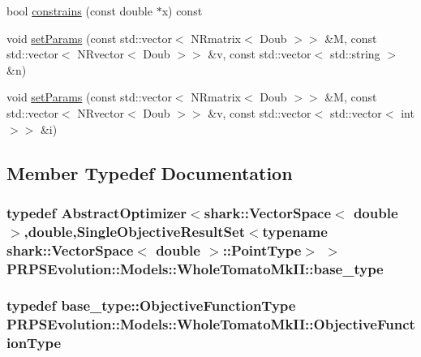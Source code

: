 \begin{DoxyCompactItemize}
\item 
bool \hyperlink{struct_p_r_p_s_evolution_1_1_models_1_1_whole_tomato_mk_i_i_ae8e8d8ff95ca2f9b90a9d72e06a340a0}{constrains} (const double $\ast$x) const 
\item 
void \hyperlink{struct_p_r_p_s_evolution_1_1_models_1_1_whole_tomato_mk_i_i_a398211ab482a09967eb6436f35e28b76}{set\-Params} (const std\-::vector$<$ \-N\-Rmatrix$<$ \-Doub $>$$>$ \&\-M, const std\-::vector$<$ \-N\-Rvector$<$ \-Doub $>$$>$ \&v, const std\-::vector$<$ std\-::string $>$ \&n)
\item 
void \hyperlink{struct_p_r_p_s_evolution_1_1_models_1_1_whole_tomato_mk_i_i_a381dd96ddd96dea9968e07a4b980ab8f}{set\-Params} (const std\-::vector$<$ \-N\-Rmatrix$<$ \-Doub $>$$>$ \&\-M, const std\-::vector$<$ \-N\-Rvector$<$ \-Doub $>$$>$ \&v, const std\-::vector$<$ std\-::vector$<$ int $>$$>$ \&i)
\end{DoxyCompactItemize}


\subsection{\-Member \-Typedef \-Documentation}
\hypertarget{struct_p_r_p_s_evolution_1_1_models_1_1_whole_tomato_mk_i_i_aaf58d587c99a6c98c606c5c60b195a0f}{
\subsubsection[{base\-\_\-type}]{\setlength{\rightskip}{0pt plus 5cm}typedef \-Abstract\-Optimizer$<$shark\-::\-Vector\-Space$<$ double $>$,double,\-Single\-Objective\-Result\-Set$<$typename shark\-::\-Vector\-Space$<$ double $>$\-::\-Point\-Type$>$ $>$ {\bf \-P\-R\-P\-S\-Evolution\-::\-Models\-::\-Whole\-Tomato\-Mk\-I\-I\-::base\-\_\-type}}}\label{struct_p_r_p_s_evolution_1_1_models_1_1_whole_tomato_mk_i_i_aaf58d587c99a6c98c606c5c60b195a0f}
\hypertarget{struct_p_r_p_s_evolution_1_1_models_1_1_whole_tomato_mk_i_i_a6a309578c1c90c4602553162115ff124}{
\subsubsection[{\-Objective\-Function\-Type}]{\setlength{\rightskip}{0pt plus 5cm}typedef base\-\_\-type\-::\-Objective\-Function\-Type {\bf \-P\-R\-P\-S\-Evolution\-::\-Models\-::\-Whole\-Tomato\-Mk\-I\-I\-::\-Objective\-Function\-Type}}}\label{struct_p_r_p_s_evolution_1_1_models_1_1_whole_tomato_mk_i_i_a6a309578c1c90c4602553162115ff124}


